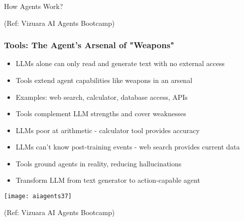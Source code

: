 \begin{frame}[fragile]\frametitle{}
\begin{center}
{\Large How Agents Work?}

{\tiny (Ref: Vizuara AI Agents Bootcamp)}
\end{center}
\end{frame}

\begin{frame}[fragile]\frametitle{Tools: The Agent's Arsenal of "Weapons"}
      \begin{itemize}
	  \item LLMs alone can only read and generate text with no external access
	  \item Tools extend agent capabilities like weapons in an arsenal
	  \item Examples: web search, calculator, database access, APIs
	  \item Tools complement LLM strengths and cover weaknesses
	  \item LLMs poor at arithmetic - calculator tool provides accuracy
	  \item LLMs can't know post-training events - web search provides current data
	  \item Tools ground agents in reality, reducing hallucinations
	  \item Transform LLM from text generator to action-capable agent
	  \end{itemize}
	  
		\begin{center}
		\texttt{[image: aiagents37]}

		{\tiny (Ref: Vizuara AI Agents Bootcamp)}

		\end{center}	  	  
\end{frame}

